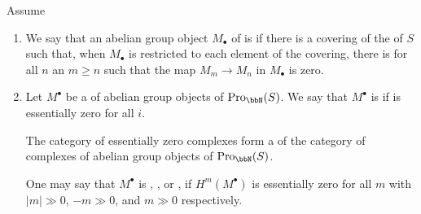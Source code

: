 \begin{definition} \label{definition:essentially_zero_inverse_sequence_essentially_bounded_complex_of_sheaves_of_abelian_groups_on_a_site}
    Assume 

   \begin{enumerate}
    \item We say that an abelian group object $M_\bullet$ of  is  if there is a covering of the  of $S$ such that, when $M_\bullet$ is restricted to each element of the covering, there is for all $n$ an $m \geq n$ such that the map $M_m \to M_n$ in $M_\bullet$ is zero. 

    \item Let $M^\bullet$ be a  of abelian group objects of $\mathrm{Pro}_{\bbN}(S)$. We say that $M^\bullet$ is  if  is essentially zero for all $i$.

    The category of essentially zero complexes form a  of the category of complexes of abelian group objects of $\mathrm{Pro}_{\bbN}(S)$.

    One may say that $M^\bullet$ is , , or , if $H^m(M^\bullet)$ is essentially zero for all $m$ with $|m| \gg 0$, $-m \gg 0$, and $m \gg 0$ respectively. 


\end{enumerate}
\end{definition}
